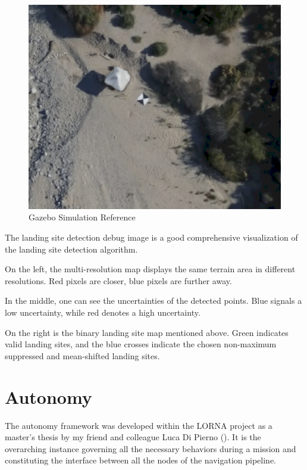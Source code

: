 \documentclass{article}
\begin{document}
\begin{figure}[ht!]
    \centering
    \includegraphics[scale=0.25]{images/system_overview/lsd_debug_reference.png}
    \caption{Gazebo Simulation Reference}
    \label{fig:lsd_debug_ref}
\end{figure}

The landing site detection debug image is a good comprehensive visualization of the landing site detection algorithm. 

On the left, the multi-resolution map displays the same terrain area in different resolutions. Red pixels are closer, blue pixels are further away.

In the middle, one can see the uncertainties of the detected points. Blue signals a low uncertainty, while red denotes a high uncertainty. 

On the right is the binary landing site map mentioned above. Green indicates valid landing sites, and the blue crosses indicate the chosen non-maximum suppressed and mean-shifted landing sites.   

\section{Autonomy}\label{sec:setup:autonomy}

The autonomy framework was developed within the LORNA project as a master's thesis by my friend and colleague Luca Di Pierno (\citep{Autonomy}). It is the overarching instance governing all the necessary behaviors during a mission and constituting the interface between all the nodes of the navigation pipeline.
\end{document}
